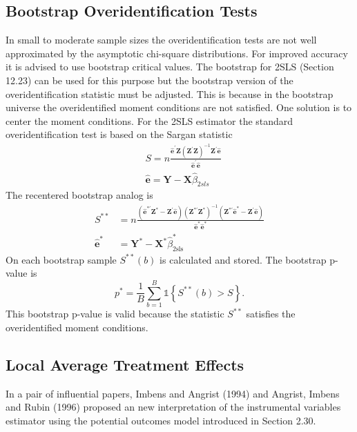 \documentclass[10pt]{article}
\begin{document}
\subsection{Bootstrap Overidentification Tests}
In small to moderate sample sizes the overidentification tests are not well approximated by the asymptotic chi-square distributions. For improved accuracy it is advised to use bootstrap critical values. The bootstrap for 2SLS (Section 12.23) can be used for this purpose but the bootstrap version of the overidentification statistic must be adjusted. This is because in the bootstrap universe the overidentified moment conditions are not satisfied. One solution is to center the moment conditions. For the 2SLS estimator the standard overidentification test is based on the Sargan statistic
$$
\begin{aligned}
&S=n \frac{\widehat{\boldsymbol{e}}^{\prime} \boldsymbol{Z}\left(\boldsymbol{Z}^{\prime} \boldsymbol{Z}\right)^{-1} \boldsymbol{Z}^{\prime} \widehat{\boldsymbol{e}}}{\widehat{\boldsymbol{e}}^{\prime} \widehat{\boldsymbol{e}}} \\
&\widehat{\boldsymbol{e}}=\boldsymbol{Y}-\boldsymbol{X} \widehat{\beta}_{2 s l s}
\end{aligned}
$$
The recentered bootstrap analog is
$$
\begin{aligned}
S^{* *} &=n \frac{\left(\widehat{\boldsymbol{e}}^{* \prime} \boldsymbol{Z}^{*}-\boldsymbol{Z}^{\prime} \widehat{\boldsymbol{e}}\right)\left(\boldsymbol{Z}^{* \prime} \boldsymbol{Z}^{*}\right)^{-1}\left(\boldsymbol{Z}^{* \prime} \widehat{\boldsymbol{e}}^{*}-\boldsymbol{Z}^{\prime} \widehat{\boldsymbol{e}}\right)}{\widehat{\boldsymbol{e}}^{*} \widehat{\boldsymbol{e}}^{*}} \\
\widehat{\boldsymbol{e}}^{*} &=\boldsymbol{Y}^{*}-\boldsymbol{X}^{*} \widehat{\beta}_{2 \mathrm{sls}}^{*}
\end{aligned}
$$
On each bootstrap sample $S^{* *}(b)$ is calculated and stored. The bootstrap p-value is
$$
p^{*}=\frac{1}{B} \sum_{b=1}^{B} \mathbb{1}\left\{S^{* *}(b)>S\right\} .
$$
This bootstrap $\mathrm{p}$-value is valid because the statistic $S^{* *}$ satisfies the overidentified moment conditions.

\subsection{Local Average Treatment Effects}
In a pair of influential papers, Imbens and Angrist (1994) and Angrist, Imbens and Rubin (1996) proposed an new interpretation of the instrumental variables estimator using the potential outcomes model introduced in Section 2.30.
\end{document}
